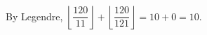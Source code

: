 By Legendre, $\left\lfloor\dfrac{120}{11}\right\rfloor+\left\lfloor\dfrac{120}{121}\right\rfloor=10+0=\boxed{10}$.
